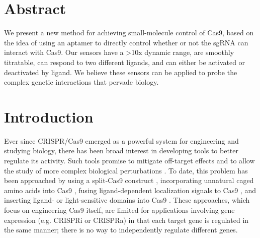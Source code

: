 \documentclass[10pt,oneside]{article}
\begin{document}
\section{Abstract}



We present a new method for achieving small-molecule control of Cas9, based on the idea of using an aptamer to directly control whether or not the sgRNA can interact with Cas9.  Our sensors have a >10x dynamic range, are smoothly titratable, can respond to two different ligands, and can either be activated or deactivated by ligand.  We believe these sensors can be applied to probe the complex genetic interactions that pervade biology.

\section{Introduction}


Ever since CRISPR/Cas9 emerged as a powerful system for engineering and studying biology, there has been broad interest in developing tools to better regulate its activity.  Such tools promise to mitigate off-target effects and to allow the study of more complex biological perturbations \autocite{richter2017}.  To date, this problem has been approached by using a split-Cas9 construct \autocite{zetsche2015,nguyen2016,nihongaki2015}, incorporating unnatural caged amino acids into Cas9 \autocite{hemphill2015,luo2016}, fusing ligand-dependent localization signals to Cas9 \autocite{liuramli2016}, and inserting ligand- or light-sensitive domains into Cas9 \autocite{oakes2016,richter2016}.  These approaches, which focus on engineering Cas9 itself, are limited for applications involving gene expression (e.g. CRISPRi or CRISPRa) in that each target gene is regulated in the same manner; there is no way to independently regulate different genes.

\end{document}
